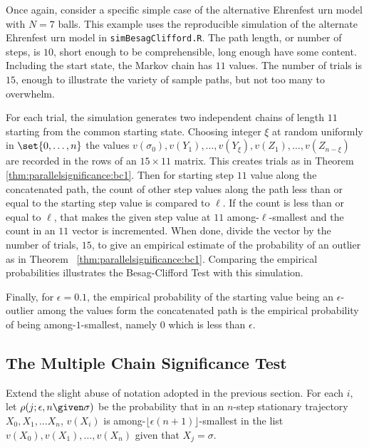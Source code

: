 \documentclass[12pt]{article}
\begin{document}
\begin{example}
    Once again, consider a specific simple case of the alternative
    Ehrenfest urn model with \( N = 7 \) balls.%
    This example uses the reproducible simulation of the alternate
    Ehrenfest urn model in \texttt{simBesagClifford.R}. The path length,
    or number of steps, is \( 10 \), short enough to be comprehensible,
    long enough have some content.  Including the start state, the
    Markov chain has \( 11 \) values. The number of trials is \( 15 \),
    enough to illustrate the variety of sample paths, but not too many
    to overwhelm.

    For each trial, the simulation generates two independent chains of
    length \( 11 \) starting from the common starting state.  Choosing
    integer \( \xi \) at random uniformly in \( \set{0, \dots, n} \) the
    values \( v(\sigma_0), v(Y_1), \dots, v(Y_{\xi} ), v(Z_1), \dots, v(Z_
    {n-\xi}) \) are recorded in the rows of an \( 15 \times 11 \)
    matrix.  This creates trials as in Theorem~%
    \ref{thm:parallelsignificance:bc1}. Then for starting step \( 11 \)
    value along the concatenated path, the count of other step values
    along the path less than or equal to the starting step value is
    compared to \( \ell \).  If the count is less than or equal to \(
    \ell \), that makes the given step value at \( 11 \) among-\( \ell \)-smallest
    and the count in an \( 11 \) vector is incremented.  When done,
    divide the vector by the number of trials, \( 15 \), to give an
    empirical estimate of the probability of an outlier as in Theorem~%
    \ref{thm:parallelsignificance:bc1}. Comparing the empirical
    probabilities illustrates the Besag-Clifford Test with this
    simulation.

    Finally, for \( \epsilon = 0.1 \), the empirical probability of the
    starting value being an \( \epsilon \)-outlier among the values form
    the concatenated path is the empirical probability of being among-\(
    1 \)-smallest, namely \( 0 \) which is less than \( \epsilon \).

\end{example}
\subsection*{The Multiple Chain Significance Test}

Extend the slight abuse of notation adopted in the previous section. For
each \( i \), let \( \rho(j; \epsilon, n \given \sigma) \) be the
probability that in an \( n \)-step stationary trajectory \( X_0, X_1,
\dots X_n \), \( v(X_i) \) is among-\( \lfloor \epsilon(n+1) \rfloor \)-smallest
in the list \( v(X_0), v(X_1), \dots, v(X_n) \) given that \( X_j =
\sigma \).
\end{document}

